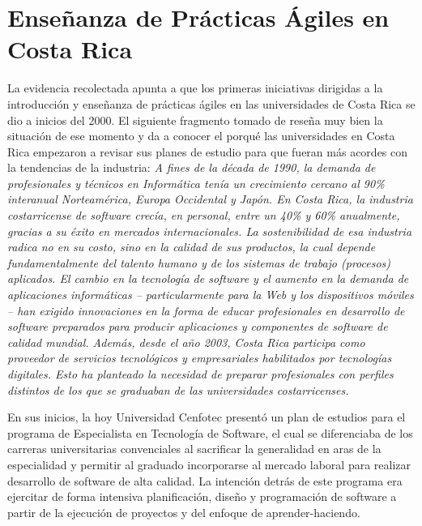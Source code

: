 \documentclass[journal]{IEEEtran}
\begin{document}
\section{Enseñanza de Prácticas Ágiles en Costa Rica} \label{sec:costa-rica}
La evidencia recolectada apunta a que los primeras iniciativas dirigidas a la introducción y enseñanza de prácticas ágiles en las universidades de Costa Rica se dio a inicios del 2000. El siguiente fragmento tomado de \cite{cenfotec-2} reseña muy bien la situación de ese momento y da a conocer el porqué las universidades en Costa Rica empezaron a revisar sus planes de estudio para que fueran más acordes con la tendencias de la industria: \emph{A fines de la década de 1990, la demanda de profesionales y técnicos en Informática tenía un crecimiento cercano al 90\% interanual Norteamérica, Europa Occidental y Japón. En Costa Rica, la industria costarricense de software crecía, en personal, entre un 40\% y 60\% anualmente, gracias a su éxito en mercados internacionales. La sostenibilidad de esa industria radica no en su costo, sino en la calidad de sus productos, la cual depende fundamentalmente del talento humano y de los sistemas de trabajo (procesos) aplicados. El cambio en la tecnología de software y el aumento en la demanda de aplicaciones informáticas – particularmente para la Web y los dispositivos móviles – han exigido innovaciones en la forma de educar profesionales en desarrollo de software preparados para producir aplicaciones y componentes de software de calidad mundial. Además, desde el año 2003, Costa Rica participa como proveedor de servicios tecnológicos y empresariales habilitados por tecnologías digitales. Esto ha planteado la necesidad de preparar profesionales con perfiles distintos de los que se graduaban de las universidades costarricenses.}

En sus inicios, la hoy Universidad Cenfotec \cite{cenfotec-1} presentó un plan de estudios para el programa de Especialista en Tecnología de Software, el cual se diferenciaba de los carreras universitarias convenciales al sacrificar la generalidad en aras de la especialidad y permitir al graduado incorporarse al mercado laboral para realizar desarrollo de software de alta calidad. La intención detrás de este programa era ejercitar de forma intensiva planificación, diseño y programación de software a partir de la ejecución de proyectos y del enfoque de aprender-haciendo.
\end{document}
